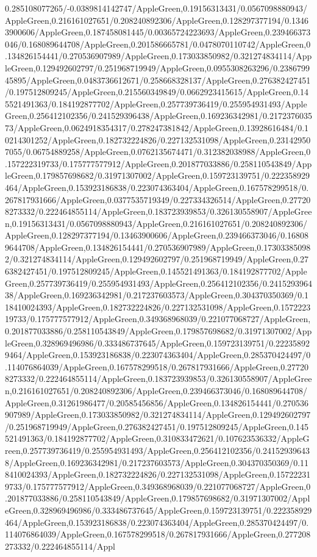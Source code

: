 {\begin{tikzternal}
{0.285108077265/-0.0389814142747/AppleGreen,0.19156313431/0.0567098880943/AppleGreen,0.216161027651/0.208240892306/AppleGreen,0.128297377194/0.13463900606/AppleGreen,0.187458081445/0.00365724223693/AppleGreen,0.239466373046/0.168089644708/AppleGreen,0.201586665781/0.0478070110742/AppleGreen,0.134826154441/0.270536907989/AppleGreen,0.173033850982/0.321274834114/AppleGreen,0.129492602797/0.251968719949/AppleGreen,0.0955308263296/0.238679945895/AppleGreen,0.0483736612671/0.258668328137/AppleGreen,0.276382427451/0.197512809245/AppleGreen,0.215560349849/0.0662923415615/AppleGreen,0.145521491363/0.184192877702/AppleGreen,0.257739736419/0.255954931493/AppleGreen,0.256412102356/0.241529396438/AppleGreen,0.169236342981/0.217237603573/AppleGreen,0.0624918354317/0.278247381842/AppleGreen,0.13928616484/0.10214301252/AppleGreen,0.182732224826/0.227132531098/AppleGreen,0.231429507055/0.06754889258/AppleGreen,0.0762135674471/0.312382038988/AppleGreen,0.157222319733/0.175777577912/AppleGreen,0.201877033886/0.258110543849/AppleGreen,0.179857698682/0.31971307002/AppleGreen,0.159723139751/0.222358929464/AppleGreen,0.153923186838/0.223074363404/AppleGreen,0.167578299518/0.267817931666/AppleGreen,0.0377535719349/0.227334326514/AppleGreen,0.277208273332/0.222464855114/AppleGreen,0.183723939853/0.326130558907/AppleGreen,0.19156313431/0.0567098880943/AppleGreen,0.216161027651/0.208240892306/AppleGreen,0.128297377194/0.13463900606/AppleGreen,0.239466373046/0.168089644708/AppleGreen,0.134826154441/0.270536907989/AppleGreen,0.173033850982/0.321274834114/AppleGreen,0.129492602797/0.251968719949/AppleGreen,0.276382427451/0.197512809245/AppleGreen,0.145521491363/0.184192877702/AppleGreen,0.257739736419/0.255954931493/AppleGreen,0.256412102356/0.241529396438/AppleGreen,0.169236342981/0.217237603573/AppleGreen,0.304370350369/0.118410024393/AppleGreen,0.182732224826/0.227132531098/AppleGreen,0.157222319733/0.175777577912/AppleGreen,0.349368968039/0.221077068727/AppleGreen,0.201877033886/0.258110543849/AppleGreen,0.179857698682/0.31971307002/AppleGreen,0.328969496986/0.333486737645/AppleGreen,0.159723139751/0.222358929464/AppleGreen,0.153923186838/0.223074363404/AppleGreen,0.285370424497/0.114076864039/AppleGreen,0.167578299518/0.267817931666/AppleGreen,0.277208273332/0.222464855114/AppleGreen,0.183723939853/0.326130558907/AppleGreen,0.216161027651/0.208240892306/AppleGreen,0.239466373046/0.168089644708/AppleGreen,0.31261986477/0.20585456856/AppleGreen,0.134826154441/0.270536907989/AppleGreen,0.173033850982/0.321274834114/AppleGreen,0.129492602797/0.251968719949/AppleGreen,0.276382427451/0.197512809245/AppleGreen,0.145521491363/0.184192877702/AppleGreen,0.310833472621/0.107623536332/AppleGreen,0.257739736419/0.255954931493/AppleGreen,0.256412102356/0.241529396438/AppleGreen,0.169236342981/0.217237603573/AppleGreen,0.304370350369/0.118410024393/AppleGreen,0.182732224826/0.227132531098/AppleGreen,0.157222319733/0.175777577912/AppleGreen,0.349368968039/0.221077068727/AppleGreen,0.201877033886/0.258110543849/AppleGreen,0.179857698682/0.31971307002/AppleGreen,0.328969496986/0.333486737645/AppleGreen,0.159723139751/0.222358929464/AppleGreen,0.153923186838/0.223074363404/AppleGreen,0.285370424497/0.114076864039/AppleGreen,0.167578299518/0.267817931666/AppleGreen,0.277208273332/0.222464855114/Appl}
\end{tikzternal}}
